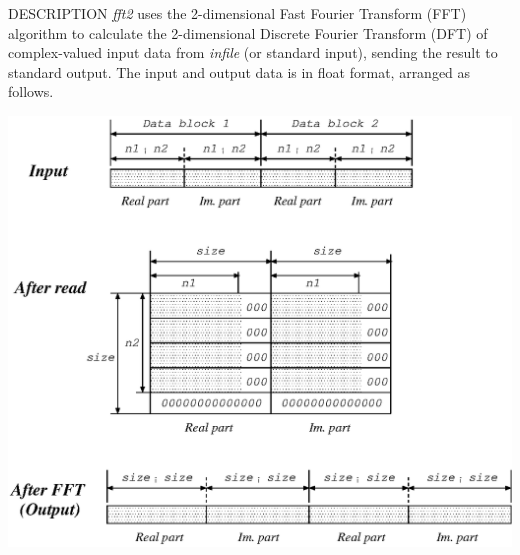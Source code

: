 \begin{synopsis}
\item[fft2] [ --l $L$ ] [ --m $M_1 \; M_2$ ] [ --t ] [ --c ] [ --q ] 
            [ --\{ A $|$ R $|$ I $|$ P \} ]  
\item[\ ~~~~] [ {\em infile} ]  
\end{synopsis}

\begin{qsection}{DESCRIPTION}
{\em fft2} uses the 2-dimensional Fast Fourier Transform (FFT) algorithm 
to calculate the 2-dimensional Discrete Fourier Transform (DFT) 
of complex-valued input data from {\em infile} (or standard input), 
sending the result to standard output. 
The input and output data is in float format, arranged as follows.
\begin{center}
\leavevmode
\includegraphics{fig/fft2.eps}
\end{center}
\end{qsection}

